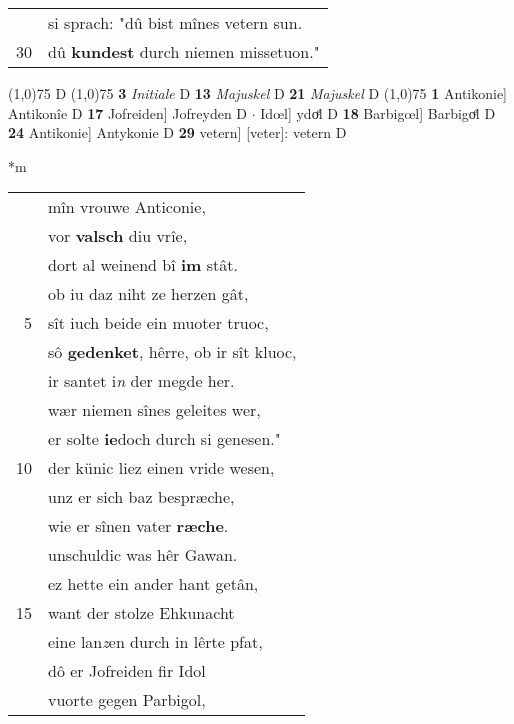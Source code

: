 \documentclass[8pt,a4paper,notitlepage]{article}
\begin{document}
\begin{table}[ht]
\begin{minipage}[t]{0.5\linewidth}
\begin{tabular}{rl}
 & si sprach: "dû bist mînes vetern sun.\\ 
30 & dû \textbf{kundest} durch niemen missetuon."\\ 
\end{tabular}
\scriptsize
\line(1,0){75} \newline
D \newline
\line(1,0){75} \newline
\textbf{3} \textit{Initiale} D  \textbf{13} \textit{Majuskel} D  \textbf{21} \textit{Majuskel} D  \newline
\line(1,0){75} \newline
\textbf{1} Antikonie] Antikonîe D \textbf{17} Jofreiden] Jofreyden D  $\cdot$ Idœl] ydoͤl D \textbf{18} Barbigœl] Barbigoͤl D \textbf{24} Antikonie] Antykonie D \textbf{29} vetern] [veter]: vetern D \newline
\end{minipage}
\hspace{0.5cm}
\begin{minipage}[t]{0.5\linewidth}
\small
\begin{center}*m
\end{center}
\begin{tabular}{rl}
 & mîn vrouwe Anticonie,\\ 
 & vor \textbf{valsch} diu vrîe,\\ 
 & dort al weinend bî \textbf{im} stât.\\ 
 & ob iu daz niht ze herzen gât,\\ 
5 & sît iuch beide ein muoter truoc,\\ 
 & sô \textbf{gedenket}, hêrre, ob ir sît kluoc,\\ 
 & ir santet i\textit{n} der megde her.\\ 
 & wær niemen sînes geleites wer,\\ 
 & er solte \textbf{ie}doch durch si genesen."\\ 
10 & der künic liez einen vride wesen,\\ 
 & unz er sich baz bespræche,\\ 
 & wie er sînen vater \textbf{ræche}.\\ 
 & unschuldic was hêr Gawan.\\ 
 & ez hette ein ander hant getân,\\ 
15 & want der stolze Ehkunacht\\ 
 & eine lan\textit{z}en durch in lêrte pfat,\\ 
 & dô er Jofreiden fir Idol\\ 
 & vuorte gegen Parbigol,\\ 

\end{tabular}
\end{minipage}
\end{table}
\end{document}
